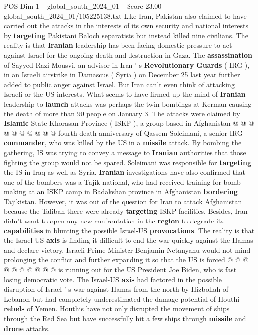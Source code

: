 \begin{textsample}{POS Dim 1 – global\_south\_2024\_01 – Score 23.00 – global\_south\_2024\_01/105225138.txt}
Like Iran, Pakistan also claimed to have carried out the attacks in the interests of its own security and national interests by \textbf{targeting} Pakistani Baloch separatists but instead killed nine civilians.
The reality is that \textbf{Iranian} leadership has been facing domestic pressure to act against Israel for the ongoing death and destruction in Gaza.
The \textbf{assassination} of Sayyed Razi Mousvi, an advisor in Iran ' s \textbf{Revolutionary} \textbf{Guards} ( IRG ), in an Israeli airstrike in Damascus ( Syria ) on December 25 last year further added to public anger against Israel.
But Iran can't even think of attacking Israeli or the US interests.
What seems to have firmed up the mind of \textbf{Iranian} leadership to \textbf{launch} attacks was perhaps the twin bombings at Kerman causing the death of more than 90 people on January 3.
The attacks were claimed by \textbf{Islamic} State Khorasan Province ( ISKP ), a group based in Afghanistan @ @ @ @ @ @ @ @ @ @ fourth death anniversary of Qassem Soleimani, a senior IRG \textbf{commander}, who was killed by the US in a \textbf{missile} attack.
By bombing the gathering, IS was trying to convey a message to \textbf{Iranian} authorities that those fighting the group would not be spared.
Soleimani was responsible for \textbf{targeting} the IS in Iraq as well as Syria. \textbf{Iranian} investigations have also confirmed that one of the bombers was a Tajik national, who had received training for bomb making at an ISKP camp in Badakshan province in Afghanistan \textbf{bordering} Tajikistan.
However, it was out of the question for Iran to attack Afghanistan because the Taliban there were already \textbf{targeting} ISKP facilities.
Besides, Iran didn't want to open any new confrontation in the \textbf{region} to degrade its \textbf{capabilities} in blunting the possible Israel-US \textbf{provocations}.
The reality is that the Israel-US \textbf{axis} is finding it difficult to end the war quickly against the Hamas and declare victory.
Israeli Prime Minister Benjamin Netanyahu would not mind prolonging the conflict and further expanding it so that the US is forced @ @ @ @ @ @ @ @ @ @ is running out for the US President Joe Biden, who is fast losing democratic vote.
The Israel-US \textbf{axis} had factored in the possible disruption of Israel ' s war against Hamas from the north by Hizbollah of Lebanon but had completely underestimated the damage potential of Houthi \textbf{rebels} of Yemen.
Houthis have not only disrupted the movement of ships through the Red Sea but have successfully hit a few ships through \textbf{missile} and \textbf{drone} attacks.

\end{textsample}
